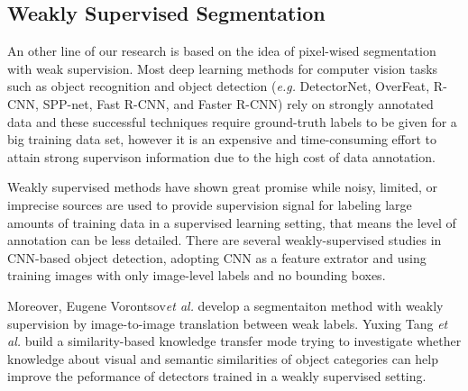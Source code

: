 \documentclass[10pt,twocolumn,letterpaper]{article}
\begin{document}
\subsection{Weakly Supervised Segmentation}
An other line of our research is based on the idea of pixel-wised segmentation with weak supervision.
Most deep learning methods for computer vision tasks such as object recognition\cite{simonyan2014very}\cite{russakovsky2015imagenet} and object detection (\textit{e.g.} DetectorNet\cite{szegedy2013deep}, OverFeat\cite{sermanet2013overfeat}, R-CNN\cite{girshick2014rich}, SPP-net\cite{he2015spatial}, Fast R-CNN\cite{girshick2015fast}, and Faster R-CNN\cite{ren2015faster}) rely on strongly annotated data and these successful techniques require ground-truth labels to be given for a big training data set, 
however it is an expensive and time-consuming effort to attain strong supervison information due to the high cost of data annotation.

Weakly supervised methods\cite{Bilen_2016_CVPR}\cite{Peyre_2017_ICCV}\cite{arandjelovic2016netvlad} have shown great promise while noisy, limited, or imprecise sources are used to provide supervision signal for labeling large amounts of training data in a supervised learning setting, that means the level of annotation can be less detailed. 
There are several weakly-supervised studies\cite{bilen2014weakly}\cite{bilen2015weakly}\cite{song2014learning} in CNN-based object detection, adopting CNN as a feature extrator and using training images with only image-level labels and no bounding boxes.

Moreover, Eugene Vorontsov\textit{et al.} \cite{vorontsov2019boosting} develop a segmentaiton method with weakly supervision by image-to-image translation between weak labels.
Yuxing Tang \textit{et al.}\cite{tang2016large} build a similarity-based knowledge transfer mode trying to investigate whether knowledge about visual and semantic similarities of object categories can help improve the peformance of detectors trained in a weakly supervised setting.
\end{document}
